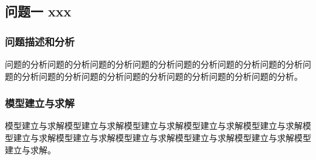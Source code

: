 \subsection{问题一 xxx}
\subsubsection{问题描述和分析}
问题的分析问题的分析问题的分析问题的分析问题的分析问题的分析问题的分析问题的分析问题的分析问题的分析问题的分析问题的分析问题的分析问题的分析。
\subsubsection{模型建立与求解}
模型建立与求解模型建立与求解模型建立与求解模型建立与求解模型建立与求解模型建立与求解模型建立与求解模型建立与求解模型建立与求解模型建立与求解模型建立与求解。
